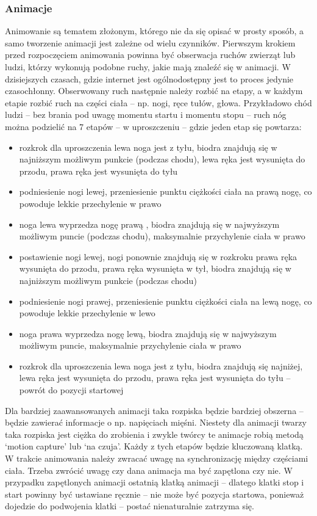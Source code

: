 \documentclass[12pt,twoside]{article}
\begin{document}
\subsubsection{Animacje}

Animowanie są tematem złożonym, którego nie da się opisać w prosty sposób, a
samo tworzenie animacji jest zależne od wielu czynników. Pierwszym krokiem przed
rozpoczęciem animowania powinna być obserwacja ruchów zwierząt lub ludzi, którzy
wykonują podobne ruchy, jakie mają znaleźć się w animacji. W dzisiejszych
czasach, gdzie internet jest ogólnodostępny jest to proces jedynie czasochłonny.
Obserwowany ruch następnie należy rozbić na etapy, a w każdym etapie rozbić ruch
na części ciała -- np. nogi, ręce tułów, głowa. Przykładowo chód ludzi -- bez
brania pod uwagę momentu startu i momentu stopu -- ruch nóg można podzielić na 7
etapów -- w uproszczeniu -- gdzie jeden etap się powtarza:
\begin{itemize}
\item rozkrok dla uproszczenia lewa noga jest z tyłu, biodra znajdują się w najniższym możliwym punkcie (podczas chodu), lewa  ręka jest wysunięta do przodu, prawa ręka jest wysunięta do tyłu
\item podniesienie nogi lewej, przeniesienie punktu ciężkości ciała na prawą nogę, co powoduje lekkie przechylenie w prawo
\item noga lewa wyprzedza nogę prawą , biodra znajdują się w najwyższym możliwym puncie (podczas chodu), maksymalnie przychylenie ciała w prawo
\item postawienie nogi lewej, nogi ponownie znajdują się w rozkroku prawa ręka wysunięta do przodu, prawa ręka wysunięta w tył, biodra znajdują się w najniższym możliwym punkcie (podczas chodu)
\item podniesienie nogi prawej, przeniesienie punktu ciężkości ciała na lewą nogę, co powoduje lekkie przechylenie w lewo
\item noga prawa wyprzedza nogę lewą, biodra znajdują się w najwyższym możliwym puncie, maksymalnie przychylenie ciała w prawo
\item rozkrok dla uproszczenia lewa noga jest z tyłu, biodra znajdują się najniżej, lewa  ręka jest wysunięta do przodu, prawa ręka jest wysunięta do tyłu -- powrót do pozycji startowej
\end{itemize}
Dla bardziej zaawansowanych animacji taka rozpiska będzie bardziej obszerna –
będzie zawierać informacje o np. napięciach mięśni. Niestety dla animacji twarzy
taka rozpiska jest ciężka do zrobienia i zwykle twórcy te animacje robią metodą
`motion capture' lub `na czuja'. Każdy z tych etapów będzie kluczowaną klatką. W
trakcie animowania należy zwracać uwagę na synchronizację między częściami
ciała.  Trzeba zwrócić uwagę czy dana animacja ma być zapętlona czy nie. W
przypadku zapętlonych animacji ostatnią klatką animacji -- dlatego klatki stop i
start powinny być ustawiane ręcznie -- nie może być pozycja startowa, ponieważ
dojedzie do podwojenia klatki -- postać nienaturalnie zatrzyma się. 
\end{document}
